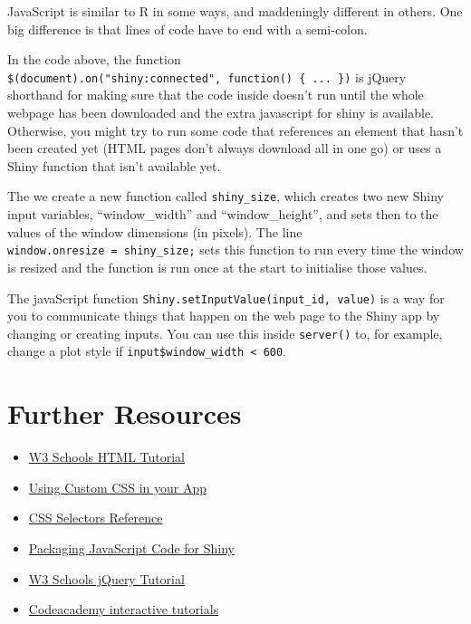 \documentclass[
]{book}
\providecommand{\tightlist}{%
  \setlength{\itemsep}{0pt}\setlength{\parskip}{0pt}}
\begin{document}
JavaScript is similar to R in some ways, and maddeningly different in others. One big difference is that lines of code have to end with a semi-colon.

In the code above, the function \texttt{\$(document).on("shiny:connected",\ function()\ \{\ ...\ \})} is jQuery shorthand for making sure that the code inside doesn't run until the whole webpage has been downloaded and the extra javascript for shiny is available. Otherwise, you might try to run some code that references an element that hasn't been created yet (HTML pages don't always download all in one go) or uses a Shiny function that isn't available yet.

The we create a new function called \texttt{shiny\_size}, which creates two new Shiny input variables, ``window\_width'' and ``window\_height'', and sets then to the values of the window dimensions (in pixels). The line \texttt{window.onresize\ =\ shiny\_size;} sets this function to run every time the window is resized and the function is run once at the start to initialise those values.

The javaScript function \texttt{Shiny.setInputValue(input\_id,\ value)} is a way for you to communicate things that happen on the web page to the Shiny app by changing or creating inputs. You can use this inside \texttt{server()} to, for example, change a plot style if \texttt{input\$window\_width\ \textless{}\ 600}.

\hypertarget{resources-web}{%
\section{Further Resources}\label{resources-web}}

\begin{itemize}
\tightlist
\item
  \href{https://www.w3schools.com/html/}{W3 Schools HTML Tutorial}
\item
  \href{https://shiny.rstudio.com/articles/css.html}{Using Custom CSS in your App}
\item
  \href{https://www.w3schools.com/cssref/css_selectors.asp}{CSS Selectors Reference}
\item
  \href{https://shiny.rstudio.com/articles/packaging-javascript.html}{Packaging JavaScript Code for Shiny}
\item
  \href{https://www.w3schools.com/jquERy/default.asp}{W3 Schools jQuery Tutorial}
\item
  \href{https://www.codecademy.com/en/tracks/htmlcss}{Codeacademy interactive tutorials}
\end{itemize}
\end{document}

